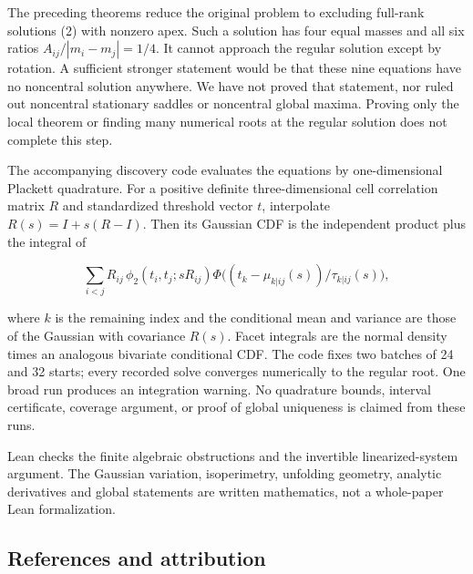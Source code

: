 \documentclass[
  11pt,
]{article}
\begin{document}
The preceding theorems reduce the original problem to excluding
full-rank solutions (2) with nonzero apex. Such a solution has four
equal masses and all six ratios \(A_{ij}/|m_i-m_j|=1/4\). It cannot
approach the regular solution except by rotation. A sufficient stronger
statement would be that these nine equations have no noncentral solution
anywhere. We have not proved that statement, nor ruled out noncentral
stationary saddles or noncentral global maxima. Proving only the local
theorem or finding many numerical roots at the regular solution does not
complete this step.

The accompanying discovery code evaluates the equations by
one-dimensional Plackett quadrature. For a positive definite
three-dimensional cell correlation matrix \(R\) and standardized
threshold vector \(t\), interpolate \(R(s)=I+s(R-I)\). Then its Gaussian
CDF is the independent product plus the integral of

\[
 \sum_{i<j}R_{ij}\,\phi_2(t_i,t_j;sR_{ij})
   \Phi\big((t_k-\mu_{k|ij}(s))/\tau_{k|ij}(s)\big),       \tag{23}
\]

where \(k\) is the remaining index and the conditional mean and variance
are those of the Gaussian with covariance \(R(s)\). Facet integrals are
the normal density times an analogous bivariate conditional CDF. The
code fixes two batches of 24 and 32 starts; every recorded solve
converges numerically to the regular root. One broad run produces an
integration warning. No quadrature bounds, interval certificate,
coverage argument, or proof of global uniqueness is claimed from these
runs.

Lean checks the finite algebraic obstructions and the invertible
linearized-system argument. The Gaussian variation, isoperimetry,
unfolding geometry, analytic derivatives and global statements are
written mathematics, not a whole-paper Lean formalization.

\subsection{References and
attribution}\label{references-and-attribution}
\end{document}
